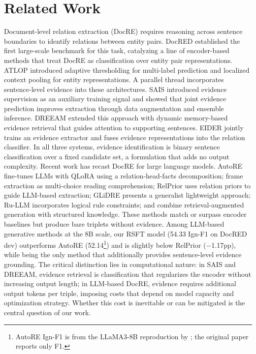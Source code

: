 \section{Related Work}
\label{sec:related_work}

Document-level relation extraction (DocRE) requires reasoning across sentence boundaries to identify relations between entity pairs.
DocRED \citep{yao2019docred} established the first large-scale benchmark for this task, catalyzing a line of encoder-based methods that treat DocRE as classification over entity pair representations.
ATLOP \citep{zhou2021atlop} introduced adaptive thresholding for multi-label prediction and localized context pooling for entity representations.
A parallel thread incorporates sentence-level evidence into these architectures.
SAIS \citep{xiao2022sais} introduced evidence supervision as an auxiliary training signal and showed that joint evidence prediction improves extraction through data augmentation and ensemble inference.
DREEAM \citep{ma2023dreeam} extended this approach with dynamic memory-based evidence retrieval that guides attention to supporting sentences.
EIDER \citep{xie2022eider} jointly trains an evidence extractor and fuses evidence representations into the relation classifier.
In all three systems, evidence identification is binary sentence classification over a fixed candidate set, a formulation that adds no output complexity.
Recent work has recast DocRE for large language models.
AutoRE \citep{autore2024} fine-tunes LLMs with QLoRA using a relation-head-facts decomposition; \citet{xu2024lmrc} frame extraction as multi-choice reading comprehension; RelPrior \citep{wang2025relprior} uses relation priors to guide LLM-based extraction; GLiDRE \citep{zhang2025glidre} presents a generalist lightweight approach; Ru-LLM \citep{wang2025rullm} incorporates logical rule constraints; and \citet{chen2025docksrag} combine retrieval-augmented generation with structured knowledge.
These methods match or surpass encoder baselines but produce bare triplets without evidence. Among LLM-based generative methods at the 8B scale, our RSFT model (54.33 Ign-F1 on DocRED dev) outperforms AutoRE (52.14\footnote{AutoRE Ign-F1 is from the LLaMA3-8B reproduction by \citet{wang2025relprior}; the original paper reports only F1.}) and is slightly below RelPrior ($-$1.17pp), while being the only method that additionally provides sentence-level evidence grounding.
The critical distinction lies in computational nature: in SAIS and DREEAM, evidence retrieval is classification that regularizes the encoder without increasing output length; in LLM-based DocRE, evidence requires additional output tokens per triple, imposing costs that depend on model capacity and optimization strategy.
Whether this cost is inevitable or can be mitigated is the central question of our work.

